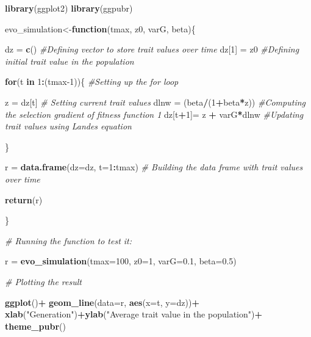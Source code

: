 \documentclass[
]{book}
\newenvironment{Shaded}{\begin{snugshade}}{\end{snugshade}}
\newcommand{\AttributeTok}[1]{\textcolor[rgb]{0.13,0.29,0.53}{#1}}
\newcommand{\CommentTok}[1]{\textcolor[rgb]{0.56,0.35,0.01}{\textit{#1}}}
\newcommand{\ControlFlowTok}[1]{\textcolor[rgb]{0.13,0.29,0.53}{\textbf{#1}}}
\newcommand{\DecValTok}[1]{\textcolor[rgb]{0.00,0.00,0.81}{#1}}
\newcommand{\FloatTok}[1]{\textcolor[rgb]{0.00,0.00,0.81}{#1}}
\newcommand{\FunctionTok}[1]{\textcolor[rgb]{0.13,0.29,0.53}{\textbf{#1}}}
\newcommand{\NormalTok}[1]{#1}
\newcommand{\OtherTok}[1]{\textcolor[rgb]{0.56,0.35,0.01}{#1}}
\newcommand{\SpecialCharTok}[1]{\textcolor[rgb]{0.81,0.36,0.00}{\textbf{#1}}}
\newcommand{\StringTok}[1]{\textcolor[rgb]{0.31,0.60,0.02}{#1}}
\begin{document}
\begin{Shaded}
\begin{Highlighting}[]
\FunctionTok{library}\NormalTok{(ggplot2)}
\FunctionTok{library}\NormalTok{(ggpubr)}

\NormalTok{evo\_simulation}\OtherTok{\textless{}{-}}\ControlFlowTok{function}\NormalTok{(tmax, z0, varG, beta)\{}

\NormalTok{dz }\OtherTok{=} \FunctionTok{c}\NormalTok{() }\CommentTok{\#Defining vector to store trait values over time}
\NormalTok{dz[}\DecValTok{1}\NormalTok{] }\OtherTok{=}\NormalTok{ z0 }\CommentTok{\#Defining initial trait value in the population}

\ControlFlowTok{for}\NormalTok{(t }\ControlFlowTok{in} \DecValTok{1}\SpecialCharTok{:}\NormalTok{(tmax}\DecValTok{{-}1}\NormalTok{))\{ }\CommentTok{\#Setting up the for loop}
  
\NormalTok{  z }\OtherTok{=}\NormalTok{ dz[t] }\CommentTok{\# Setting current trait values}
\NormalTok{  dlnw }\OtherTok{=}\NormalTok{ (beta}\SpecialCharTok{/}\NormalTok{(}\DecValTok{1}\SpecialCharTok{+}\NormalTok{beta}\SpecialCharTok{*}\NormalTok{z))  }\CommentTok{\#Computing the selection gradient of fitness function 1}
\NormalTok{  dz[t}\SpecialCharTok{+}\DecValTok{1}\NormalTok{]}\OtherTok{=}\NormalTok{ z }\SpecialCharTok{+}\NormalTok{ varG}\SpecialCharTok{*}\NormalTok{dlnw }\CommentTok{\#Updating trait values using Lande\textquotesingle{}s equation}
  
\NormalTok{\}}

\NormalTok{r }\OtherTok{=} \FunctionTok{data.frame}\NormalTok{(}\AttributeTok{dz=}\NormalTok{dz, }\AttributeTok{t=}\DecValTok{1}\SpecialCharTok{:}\NormalTok{tmax) }\CommentTok{\# Building the data frame with trait values over time}
  
\FunctionTok{return}\NormalTok{(r)}

\NormalTok{\}}

\CommentTok{\# Running the function to test it:}

\NormalTok{r }\OtherTok{=} \FunctionTok{evo\_simulation}\NormalTok{(}\AttributeTok{tmax=}\DecValTok{100}\NormalTok{, }\AttributeTok{z0=}\DecValTok{1}\NormalTok{, }\AttributeTok{varG=}\FloatTok{0.1}\NormalTok{, }\AttributeTok{beta=}\FloatTok{0.5}\NormalTok{)}

\CommentTok{\# Plotting the result}

\FunctionTok{ggplot}\NormalTok{()}\SpecialCharTok{+}
  \FunctionTok{geom\_line}\NormalTok{(}\AttributeTok{data=}\NormalTok{r, }\FunctionTok{aes}\NormalTok{(}\AttributeTok{x=}\NormalTok{t, }\AttributeTok{y=}\NormalTok{dz))}\SpecialCharTok{+}
  \FunctionTok{xlab}\NormalTok{(}\StringTok{"Generation"}\NormalTok{)}\SpecialCharTok{+}\FunctionTok{ylab}\NormalTok{(}\StringTok{"Average trait value in the population"}\NormalTok{)}\SpecialCharTok{+}
  \FunctionTok{theme\_pubr}\NormalTok{()}
\end{Highlighting}
\end{Shaded}
\end{document}
